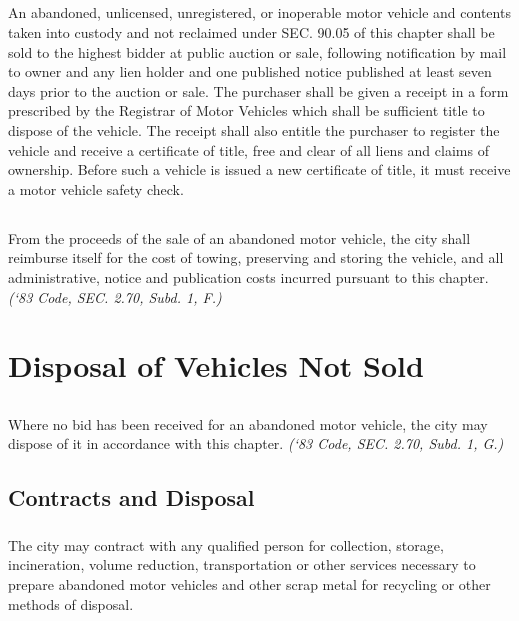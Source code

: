 \subsection{}
An abandoned, unlicensed, unregistered, or inoperable motor vehicle and contents taken into custody and not reclaimed under SEC. 90.05 of this chapter shall be sold to the highest bidder at public auction or sale, following notification by mail to owner and any lien holder and one published notice published at least seven days prior to the auction or sale. The purchaser shall be given a receipt in a form prescribed by the Registrar of Motor Vehicles which shall be sufficient title to dispose of the vehicle. The receipt shall also entitle the purchaser to register the vehicle and receive a certificate of title, free and clear of all liens and claims of ownership.  Before such a vehicle is issued a new certificate of title, it must receive a motor vehicle safety check.
\subsection{}
From the proceeds of the sale of an abandoned motor vehicle, the city shall reimburse itself for the cost of towing, preserving and storing the vehicle, and all administrative, notice and publication costs incurred pursuant to this chapter.\\
\emph{(‘83 Code, SEC. 2.70, Subd. 1, F.)}

\section{Disposal of Vehicles Not Sold}
\subsection{}
Where no bid has been received for an abandoned motor vehicle, the city may dispose of it in accordance with this chapter. \emph{(‘83 Code, SEC. 2.70, Subd. 1, G.)}
\subsection{Contracts and Disposal}
\subsubsection{}
The city may contract with any qualified person for collection, storage, incineration, volume reduction, transportation or other services necessary to prepare abandoned motor vehicles and other scrap metal for recycling or other methods of disposal.
